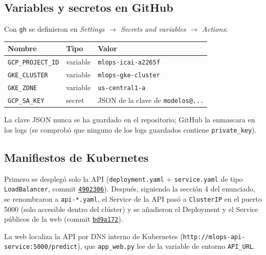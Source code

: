 \documentclass[11pt,a4paper]{article}
\newcommand{\code}[1]{\texttt{#1}}
\newcommand{\commit}[1]{\href{https://github.com/JES0406/mlops-practica-icai/commit/#1}{\code{#1}}}
\begin{document}
\subsection{Variables y secretos en GitHub}

Con \code{gh} se definieron en \emph{Settings $\rightarrow$ Secrets and variables
$\rightarrow$ Actions}:

\begin{center}
\begin{tabular}{lll}
\toprule
Nombre & Tipo & Valor \\
\midrule
\code{GCP\_PROJECT\_ID} & variable & \code{mlops-icai-a2265f} \\
\code{GKE\_CLUSTER}     & variable & \code{mlops-gke-cluster} \\
\code{GKE\_ZONE}        & variable & \code{us-central1-a} \\
\code{GCP\_SA\_KEY}     & secret   & JSON de la clave de \code{modelos@...} \\
\bottomrule
\end{tabular}
\end{center}

La clave JSON nunca se ha guardado en el repositorio; GitHub la enmascara en los logs
(se comprobó que ninguno de los logs guardados contiene \code{private\_key}).

\subsection{Manifiestos de Kubernetes}

Primero se desplegó solo la API (\code{deployment.yaml} + \code{service.yaml} de tipo
\code{LoadBalancer}, commit \commit{4902306}). Después, siguiendo la sección 4 del
enunciado, se renombraron a \code{api-*.yaml}, el Service de la API pasó a
\code{ClusterIP} en el puerto 5000 (solo accesible dentro del clúster) y se añadieron
el Deployment y el Service públicos de la web (commit \commit{bd9a172}).






La web localiza la API por DNS interno de Kubernetes
(\code{http://mlops-api-service:5000/predict}), que \code{app\_web.py} lee de la
variable de entorno \code{API\_URL}.
\end{document}
